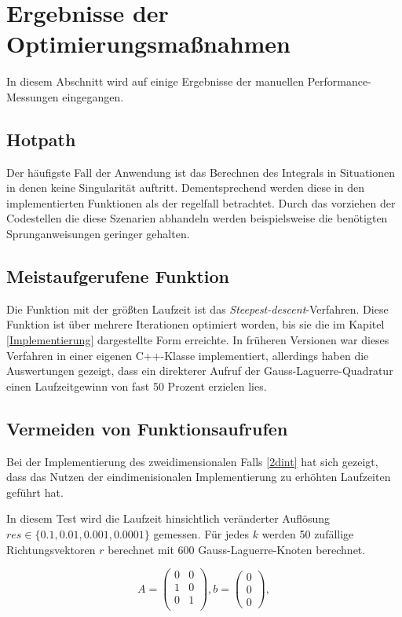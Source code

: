 \section{Ergebnisse der Optimierungsmaßnahmen}

In diesem Abschnitt wird auf einige Ergebnisse der manuellen Performance-Messungen eingegangen.

\subsection{Hotpath}

Der häufigste Fall der Anwendung ist das Berechnen des Integrals in Situationen in denen keine Singularität auftritt. 
Dementsprechend werden diese in den implementierten Funktionen als der regelfall betrachtet.
Durch das vorziehen der Codestellen die diese Szenarien abhandeln werden beispielsweise die benötigten Sprunganweisungen geringer gehalten.



\subsection{Meistaufgerufene Funktion}

Die Funktion mit der größten Laufzeit ist das \textit{Steepest-descent}-Verfahren.
Diese Funktion ist über mehrere Iterationen optimiert worden, bis sie die im Kapitel \ref{Implementierung} dargestellte Form erreichte.
In früheren Versionen war dieses Verfahren in einer eigenen C++-Klasse implementiert, allerdings haben die Auswertungen gezeigt, dass ein
direkterer Aufruf der Gauss-Laguerre-Quadratur einen Laufzeitgewinn von fast 50 Prozent erzielen lies.

\subsection{Vermeiden von Funktionsaufrufen}

Bei der Implementierung des zweidimensionalen Falls \ref{2dint} hat sich gezeigt, dass das Nutzen der eindimenisionalen Implementierung zu erhöhten Laufzeiten geführt hat.

In diesem Test wird die Laufzeit hinsichtlich veränderter Auflösung $res \in \{ 0.1, 0.01, 0.001, 0.0001 \}$ gemessen.
Für jedes $k$ werden 50 zufällige Richtungsvektoren $r$ berechnet mit 600 Gauss-Laguerre-Knoten berechnet.

\begin{equation}
  A = \begin{pmatrix}
      0 & 0 \\
      1 & 0 \\
      0 & 1 \\
  \end{pmatrix}, b = \begin{pmatrix}
      0 \\ 0\\ 0
  \end{pmatrix},
\end{equation}

